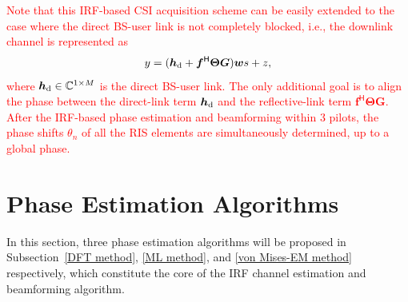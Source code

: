 \documentclass[journal,twocolumn]{IEEEtran}
\theoremstyle{nonumberplain}
\def \H {^{\mathsf{H}}}
\newcommand{\red}[1]{\textcolor{red}{#1}}
\begin{document}
    \red{
    Note that this IRF-based CSI acquisition scheme can be easily extended to the case where the direct BS-user link is not completely blocked, i.e., the downlink channel is represented as 
    \begin{equation}
        y = ({\bm h}_{\rm d} + {\bm f}\H {\bm \Theta}{\bm G}){\bm w}s + z,
    \end{equation}
    where ${\bm h}_{\rm d}\in\mathbb{C}^{1\times M}$ is the direct BS-user link. 
    The only additional goal is to align the phase between the direct-link term ${\bm h}_{\rm d}$ and the reflective-link term ${\bm f}\H {\bm \Theta}{\bm G}$. 
    After the IRF-based phase estimation and beamforming within 3 pilots, the phase shifts $\theta_n$ of all the RIS elements are simultaneously determined, up to a global phase.  
    }

    
\section{Phase Estimation Algorithms}
In this section, three phase estimation algorithms will be proposed in Subsection~\ref{DFT method}, \ref{ML method}, and \ref{von Mises-EM method} respectively, which constitute the core of the \ac{IRF} channel estimation and beamforming algorithm.
\end{document}

